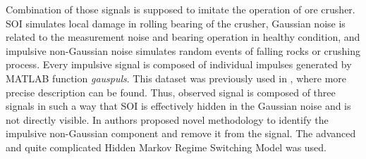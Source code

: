 \documentclass[journal]{IEEEtran}
\begin{document}
Combination of those signals is supposed to imitate the operation of ore crusher. SOI simulates local damage in rolling bearing of the crusher, Gaussian noise is related to the measurement noise and bearing operation in healthy condition, and impulsive non-Gaussian noise simulates random events of falling rocks or crushing process. Every impulsive signal is composed of individual impulses generated by MATLAB function \emph{gauspuls}. This dataset was previously used in \cite{wylomanskaimpulsive}, where more precise description can be found. Thus, observed signal is composed of three signals in such a way that SOI is effectively hidden in the Gaussian noise and is not directly visible. In \cite{wylomanskaimpulsive} authors proposed novel methodology to identify the impulsive non-Gaussian component and remove it from the signal. The  advanced and quite complicated Hidden Markov Regime Switching Model was used.

\end{document}
